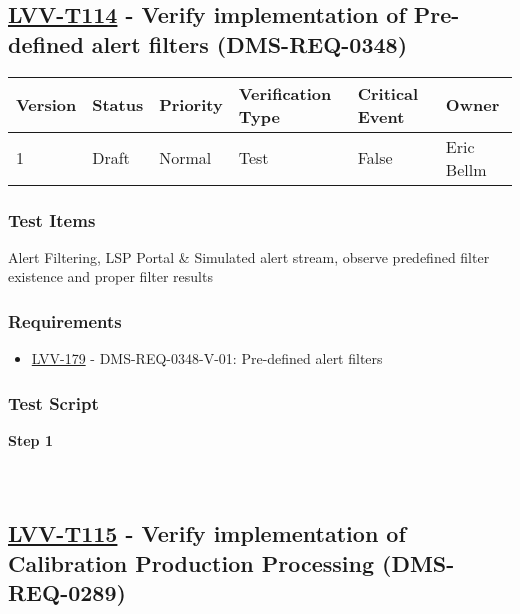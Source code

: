 \hypertarget{lvv-t114---verify-implementation-of-pre-defined-alert-filters-dms-req-0348}{%
\subsection{\texorpdfstring{\href{https://jira.lsstcorp.org/secure/Tests.jspa\#/testCase/LVV-T114}{LVV-T114}
- Verify implementation of Pre-defined alert filters
(DMS-REQ-0348)}{LVV-T114 - Verify implementation of Pre-defined alert filters (DMS-REQ-0348)}}\label{lvv-t114---verify-implementation-of-pre-defined-alert-filters-dms-req-0348}}

\begin{longtable}[]{@{}llllll@{}}
\toprule
Version & Status & Priority & Verification Type & Critical Event &
Owner\tabularnewline
\midrule
\endhead
1 & Draft & Normal & Test & False & Eric Bellm\tabularnewline
\bottomrule
\end{longtable}

\hypertarget{test-items-90}{%
\subsubsection{Test Items}\label{test-items-90}}

Alert Filtering, LSP Portal \& Simulated alert stream, observe
predefined filter existence and proper filter results

\hypertarget{requirements-91}{%
\subsubsection{Requirements}\label{requirements-91}}

\begin{itemize}
\tightlist
\item
  \href{https://jira.lsstcorp.org/browse/LVV-179}{LVV-179} -
  DMS-REQ-0348-V-01: Pre-defined alert filters
\end{itemize}

\hypertarget{test-script-91}{%
\subsubsection{Test Script}\label{test-script-91}}

\textbf{Step 1}\\
~\\
~\\

\hypertarget{lvv-t115---verify-implementation-of-calibration-production-processing-dms-req-0289}{%
\subsection{\texorpdfstring{\href{https://jira.lsstcorp.org/secure/Tests.jspa\#/testCase/LVV-T115}{LVV-T115}
- Verify implementation of Calibration Production Processing
(DMS-REQ-0289)}{LVV-T115 - Verify implementation of Calibration Production Processing (DMS-REQ-0289)}}\label{lvv-t115---verify-implementation-of-calibration-production-processing-dms-req-0289}}


